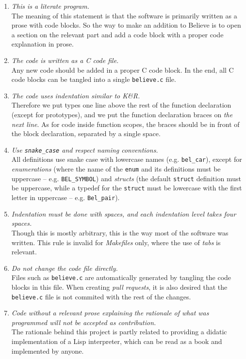 \documentclass[openright,a4paper,twoside,12pt]{memoir}
\begin{document}
\begin{enumerate}
\item \emph{This is a literate program.}\\
The meaning of this statement is that the software is primarily
written as a prose with code blocks. So the way to make an addition
to Believe is to open a section on the relevant part and add a code
block with a proper code explanation in prose.
\item \emph{The code is written as a C code file.}\\
Any new code should be added in a proper C code block. In the end,
all C code blocks can be tangled into a single \texttt{believe.c} file.
\item \emph{The code uses indentation similar to K\&R.}\\
Therefore we put types one line above the rest of the function
declaration (except for prototypes), and we put the function
declaration braces on \emph{the next line}. As for code inside function
scopes, the braces should be in front of the block declaration,
separated by a single space.
\item \emph{Use \texttt{snake\_case} and respect naming conventions.}\\
All definitions use snake case with lowercase names (e.g. \texttt{bel\_car}),
except for \emph{enumerations} (where the name of the \texttt{enum} and its
definitions must be uppercase -- e.g. \texttt{BEL\_SYMBOL}) and \emph{structs} (the
default \texttt{struct} definition must be uppercase, while a typedef for
the \texttt{struct} must be lowercase with the first letter in uppercase --
e.g. \texttt{Bel\_pair}).
\item \emph{Indentation must be done with spaces, and each indentation level
takes four spaces.}\\
Though this is mostly arbitrary, this is the way most of the
software was written. This rule is invalid for \emph{Makefiles} only,
where the use of \emph{tabs} is relevant.
\item \emph{Do not change the code file directly.}\\
Files such as \texttt{believe.c} are automatically generated by tangling the
code blocks in this file. When creating \emph{pull requests}, it is also
desired that the \texttt{believe.c} file is not commited with the rest of
the changes.
\item \emph{Code without a relevant prose explaining the rationale of what was
programmed will not be accepted as contribution.}\\
The rationale behind this project is partly related to providing
a didatic implementation of a Lisp interpreter, which can be read
as a book and implemented by anyone.
\end{enumerate}
\end{document}
